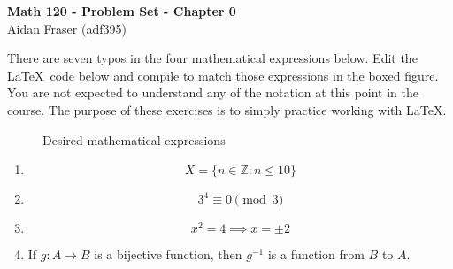 \documentclass[12pt]{article}
\begin{document}
	
	\sffamily
	\begin{center}
		\textbf{\Large{Math 120 - Problem Set - Chapter 0}} \\
\Large{Aidan Fraser (adf395)} %

	\end{center}

There are seven typos in the four mathematical expressions below. Edit the \LaTeX\ code below and compile to match those expressions in the boxed figure. You are not expected to understand any of the notation at this point in the course. The purpose of these exercises is to simply practice working with \LaTeX.

\begin{figure}[h]
    \centering
    \caption{Desired mathematical expressions} \label{fig:soln}
\end{figure}

\begin{enumerate}
\item \[X = \{n \in \mathbb{Z} : n \le 10 \}\]

\item $$ 3^{4} \equiv 0 \pmod{3} $$

\item \[x^2 = 4 \implies x = \pm2\]

\item If $g\colon A \to B$ is a bijective function, then $g^{-1}$ is a function from $B$ to $A$.

\end{enumerate}
\end{document}
